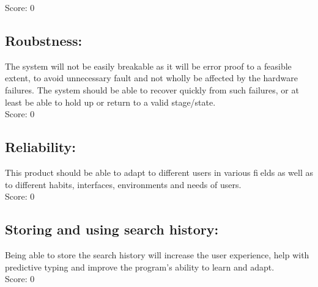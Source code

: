 \documentclass[11pt]{article}
\begin{document}
	Score: 0    
    \subsection{Roubstness:}
The system will not be easily breakable as it will be error proof to a feasible extent, to avoid unnecessary fault and not wholly be affected by the hardware failures. The system should be able to recover quickly from such failures, or at least be able to hold up or return to a valid stage/state.\\
    
	Score: 0    
    \subsection{Reliability:}
	This product should be able to adapt to different users in various fields as well as to different habits, interfaces, environments and needs of users.\\

	Score: 0    
    \subsection{Storing and using search history:}
	Being able to store the search history will increase the user experience, help with predictive typing and improve the program's ability to learn and adapt.\\

	Score: 0    
        
        \newpage
        
\end{document}
